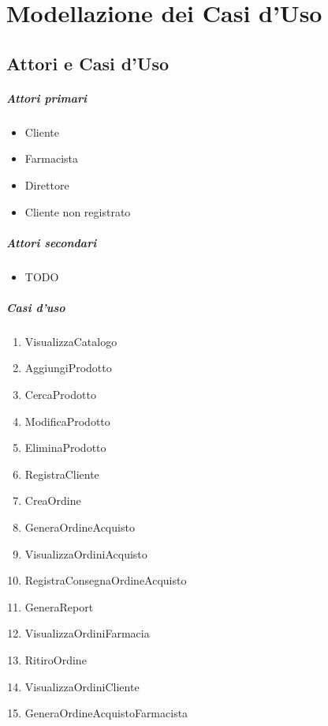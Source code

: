 \chapter{Modellazione dei Casi d'Uso}

\section{Attori e Casi d'Uso}

\paragraph{Attori primari}
\begin{itemize}
	\item Cliente
	\item Farmacista
	\item Direttore
	\item Cliente non registrato
\end{itemize}

\paragraph{Attori secondari}
\begin{itemize}
	\item TODO
\end{itemize}

\paragraph{Casi d'uso}
\begin{enumerate}
	\item VisualizzaCatalogo %
	\item AggiungiProdotto %
	\item CercaProdotto %
	\item ModificaProdotto %
	\item EliminaProdotto %
	\item RegistraCliente %
	\item CreaOrdine %
	\item GeneraOrdineAcquisto %
	\item VisualizzaOrdiniAcquisto %
	\item RegistraConsegnaOrdineAcquisto %
	\item GeneraReport %
	\item VisualizzaOrdiniFarmacia %
	\item RitiroOrdine %
	\item VisualizzaOrdiniCliente %
	\item GeneraOrdineAcquistoFarmacista %
\end{enumerate}

